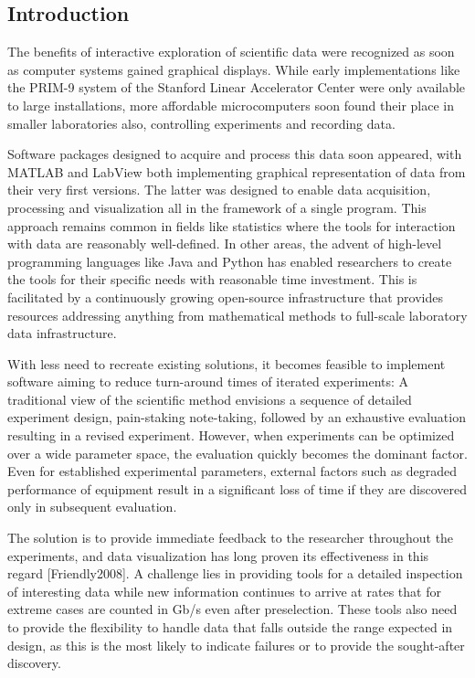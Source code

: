 


\subsection{Introduction \label{introduction}}

The benefits of interactive exploration of scientific data were recognized as soon as computer systems gained graphical displays. While early implementations like the PRIM-9 system\cite{prim9} of the Stanford Linear Accelerator Center were only available to large installations, more affordable microcomputers soon found their place in smaller laboratories also\cite{Byrd79}\cite{Reed80}, controlling experiments and recording data.

Software packages designed to acquire and process this data soon appeared, with MATLAB\cite{matlab} and LabView\cite{labview} both implementing graphical representation of data from their very first versions. The latter was designed to enable data acquisition, processing and visualization all in the framework of a single program. This approach remains common in fields like statistics where the tools for interaction with data are reasonably well-defined. In other areas, the advent of high-level programming languages like Java and Python has enabled researchers to create the tools for their specific needs with reasonable time investment. This is facilitated by a continuously growing open-source infrastructure that provides resources addressing anything from mathematical methods\cite{numpy2020} to full-scale laboratory data infrastructure\cite{Johnson2015, Koerner2019}.

With less need to recreate existing solutions, it becomes feasible to implement software aiming to reduce turn-around times of iterated experiments: A traditional view of the scientific method envisions a sequence of detailed experiment design, pain-staking note-taking, followed by an exhaustive evaluation resulting in a revised experiment. However, when experiments can be optimized over a wide parameter space, the evaluation quickly becomes the dominant factor. Even for established experimental parameters, external factors such as degraded performance of equipment result in a significant loss of time if they are discovered only in subsequent evaluation.

The solution is to provide immediate feedback to the researcher throughout the experiments, and data visualization has long proven its effectiveness in this regard [Friendly2008]. A challenge lies in providing tools for a detailed inspection of interesting data while new information continues to arrive at rates that for extreme cases are counted in Gb/s even after preselection\cite{LHC}. These tools also need to provide the flexibility to handle data that falls outside the range expected in design, as this is the most likely to indicate failures or to provide the sought-after discovery.

